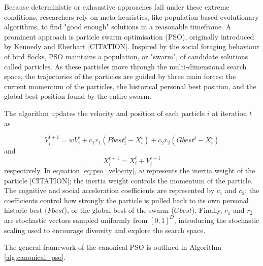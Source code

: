 \documentclass[conference]{IEEEtran}
\begin{document}
    Because deterministic or exhaustive approaches fail under these extreme conditions, researchers rely on 
    meta-heuristics, like population based evolutionary algorithms, to find "good enough" solutions in a reasonable timeframe. A 
    prominent approach is particle swarm optimisation (PSO), originally introduced by Kennedy and Eberhart [CITATION]. Inspired by the social 
    foraging behaviour of bird flocks, PSO maintains a population, or "swarm", of candidate solutions called particles.
    As these particles move through the multi-dimensional search space, the trajectories of the particles are guided by three main forces: the current momentum of the particles, 
    the historical personal best position, and the global best position found by the entire swarm. 

    The algorithm updates the velocity and position of each particle $i$ at iteration $t$ as
    
    \begin{equation}
        V_{i}^{t+1} = w V_{i}^t + c_1 r_1 (Pbest_{i}^t - X_{i}^t) + c_2 r_2 (Gbest^t - X_{i}^t)
        \label{eq:pso_velocity}
    \end{equation}
    and
    \begin{equation}
        X_{i}^{t+1} = X_{i}^t + V_{i}^{t+1}
        \label{eq:pso_position}
    \end{equation}
    respectively. In equation \ref{eq:pso_velocity}, $w$ represents the inertia weight of the particle [CITATION]; the inertia weight controls the momentum of the particle. 
    The cognitive and social acceleration coefficients are represented by $c_1$ and $c_2$; the coefficients control how strongly the particle is pulled 
    back to its own personal historic best ($Pbest$), or the global best of the swarm ($Gbest$).
    Finally, $r_1$ and $r_2$ are stochastic vectors sampled uniformly from $[0, 1]^D$, introducing the stochastic scaling used to 
    encourage diversity and explore the search space. 

    The general framework of the canonical PSO is outlined in Algorithm \ref{alg:canonical_pso}.
\end{document}
